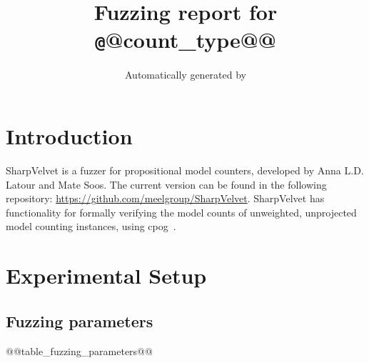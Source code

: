 \documentclass[british]{article}
\title{Fuzzing report for {\texttt @@count_type@@} }
\author{Automatically generated by \sharpvelvet{}}
\newcommand{\sharpvelvet}{{\sf SharpVelvet}}
\newcommand{\cpog}{{\sf cpog}}
\begin{document}
\maketitle %

\section{Introduction}
\label{sec:introduction}

\sharpvelvet{} is a fuzzer for propositional model counters, developed by Anna L.D. Latour and Mate Soos.
The current version can be found in the following repository: \url{https://github.com/meelgroup/SharpVelvet}.
\sharpvelvet{} has functionality for formally verifying the model counts of unweighted, unprojected model counting instances, using \cpog{}~\cite{BNAH2023}.
%
%

\section{Experimental Setup}
\label{sec:experimental-setup}

\subsection{Fuzzing parameters}
\label{subsec:fuzzing-parameters}

\begin{table}[ht]
    \begin{center}
    {\footnotesize
    \caption{Fuzzing parameters.}
    \label{tab:fuzzing-parameters}
@@table_fuzzing_parameters@@
    }
    \end{center}
\end{table}
\end{document}
